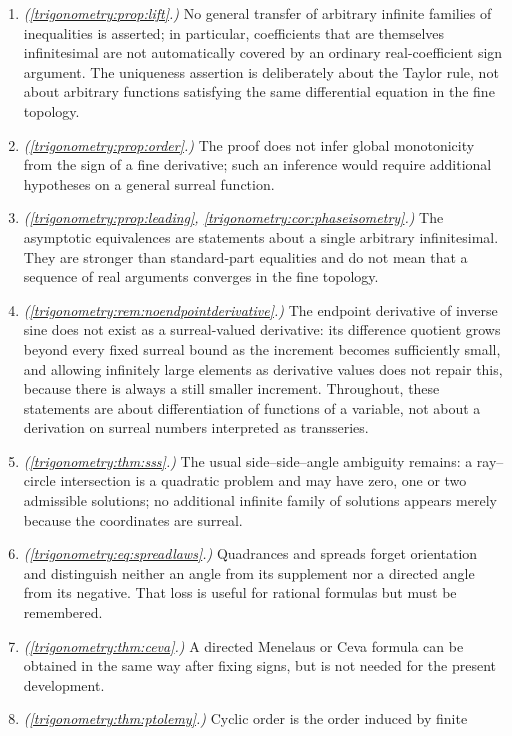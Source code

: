 \documentclass[11pt,letterpaper]{article}
\numberwithin{equation}{section}
\theoremstyle{definition}
\theoremstyle{remark}
\begin{document}
\begin{enumerate}\itemsep0.35em
\item \emph{(\cref{trigonometry:prop:lift}.)} No general transfer of arbitrary infinite families of
 inequalities is asserted; in particular, coefficients that are themselves infinitesimal are not
 automatically covered by an ordinary real-coefficient sign argument. The uniqueness assertion is
 deliberately about the Taylor rule, not about arbitrary functions satisfying the same differential
 equation in the fine topology.
\item \emph{(\cref{trigonometry:prop:order}.)} The proof does not infer global monotonicity from
 the sign of a fine derivative; such an inference would require additional hypotheses on a general
 surreal function.
\item \emph{(\cref{trigonometry:prop:leading}, \cref{trigonometry:cor:phaseisometry}.)} The
 asymptotic equivalences are statements about a single arbitrary infinitesimal. They are stronger
 than standard-part equalities and do not mean that a sequence of real arguments converges in the
 fine topology.
\item \emph{(\cref{trigonometry:rem:noendpointderivative}.)} The endpoint derivative of inverse
 sine does not exist as a surreal-valued derivative: its difference quotient grows beyond every
 fixed surreal bound as the increment becomes sufficiently small, and allowing infinitely large
 elements as derivative values does not repair this, because there is always a still smaller
 increment. Throughout, these statements are about differentiation of functions of a variable, not
 about a derivation on surreal numbers interpreted as transseries.
\item \emph{(\cref{trigonometry:thm:sss}.)} The usual side--side--angle ambiguity remains: a
 ray--circle intersection is a quadratic problem and may have zero, one or two admissible
 solutions; no additional infinite family of solutions appears merely because the coordinates are
 surreal.
\item \emph{(\cref{trigonometry:eq:spreadlaws}.)} Quadrances and spreads forget orientation and
 distinguish neither an angle from its supplement nor a directed angle from its negative. That loss
 is useful for rational formulas but must be remembered.
\item \emph{(\cref{trigonometry:thm:ceva}.)} A directed Menelaus or Ceva formula can be obtained in
 the same way after fixing signs, but is not needed for the present development.
\item \emph{(\cref{trigonometry:thm:ptolemy}.)} Cyclic order is the order induced by finite

\end{enumerate}
\end{document}
